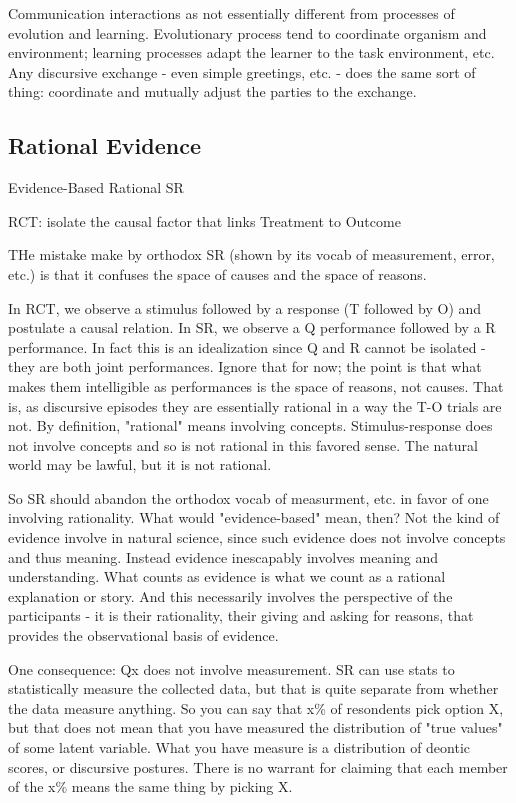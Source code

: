 \documentclass[11pt,twoside]{article}
\begin{document}
Communication interactions as not essentially different from processes
of evolution and learning.  Evolutionary process tend to coordinate
organism and environment; learning processes adapt the learner to the
task environment, etc.  Any discursive exchange - even simple
greetings, etc. - does the same sort of thing: coordinate and mutually
adjust the parties to the exchange.

\subsection{Rational Evidence}

Evidence-Based Rational SR

RCT: isolate the causal factor that links Treatment to Outcome

THe mistake make by orthodox SR (shown by its vocab of measurement,
error, etc.) is that it confuses the space of causes and the space of
reasons.

In RCT, we observe a stimulus followed by a response (T followed by O)
and postulate a causal relation.  In SR, we observe a Q performance
followed by a R performance.  In fact this is an idealization since Q
and R cannot be isolated - they are both joint performances.  Ignore
that for now; the point is that what makes them intelligible as
performances is the space of reasons, not causes.  That is, as
discursive episodes they are essentially rational in a way the T-O
trials are not.  By definition, "rational" means involving concepts.
Stimulus-response does not involve concepts and so is not rational in
this favored sense.  The natural world may be lawful, but it is not
rational.

So SR should abandon the orthodox vocab of measurment, etc. in favor
of one involving rationality.  What would "evidence-based" mean, then?
Not the kind of evidence involve in natural science, since such
evidence does not involve concepts and thus meaning.  Instead evidence
inescapably involves meaning and understanding.  What counts as
evidence is what we count as a rational explanation or story.  And
this necessarily involves the perspective of the participants - it is
their rationality, their giving and asking for reasons, that provides
the observational basis of evidence.

 One consequence: Qx does not involve measurement.  SR can use stats
 to statistically measure the collected data, but that is quite
 separate from whether the data measure anything.  So you can say that
 x\% of resondents pick option X, but that does not mean that you have
 measured the distribution of "true values" of some latent variable.
 What you have measure is a distribution of deontic scores, or
 discursive postures.  There is no warrant for claiming that each
 member of the x\% means the same thing by picking X.
\end{document}

